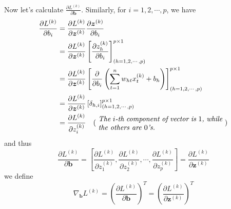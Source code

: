 \documentclass{article}
\newcommand{\Derivative}[2]{\ensuremath{\frac{\partial#1}{\partial#2}}}
\begin{document}
Now let's calculate $\Derivative{L^{(k)}}{\boldsymbol{b}}$. Similarly, for $i=1,2,\cdots,p$, we have
\begin{equation}
    \begin{split}
        \Derivative{L^{(k)}}{b_i}
        &=\Derivative{L^{(k)}}{\boldsymbol{z}^{(k)}}\Derivative{\boldsymbol{z}^{(k)}}{b_i}\\
        &=\Derivative{L^{(k)}}{\boldsymbol{z}^{(k)}}\left[
            \Derivative{z^{(k)}_h}{b_i}
        \right]^{p\times1}_{(h=1,2,\cdots,p)}\\
        &=\Derivative{L^{(k)}}{\boldsymbol{z}^{(k)}}\left[
            \Derivative{}{b_i}
            \left(
                \sum_{t=1}^n w_{ht}x^{(k)}_t+b_h
            \right)
        \right]^{p\times1}_{(h=1,2,\cdots,p)}\\
        &=\Derivative{L^{(k)}}{\boldsymbol{z}^{(k)}}\left[
            \delta_{h,i}
        \right]^{p\times1}_{(h=1,2,\cdots,p)}\\
        &=\Derivative{L^{(k)}}{z^{(k)}_i}\quad\text{(
            \parbox{0.5\linewidth}{\it The $i$-th component of vector is $1$, while the others are $0$'s.}
        )}
    \end{split}
\end{equation}
and thus
\begin{equation}
    \Derivative{L^{(k)}}{\boldsymbol{b}}=\left[
        \Derivative{L^{(k)}}{z^{(k)}_1},
        \Derivative{L^{(k)}}{z^{(k)}_2},
        \cdots,
        \Derivative{L^{(k)}}{z^{(k)}_p}
    \right]=\Derivative{L^{(k)}}{\boldsymbol{z}^{(k)}}
\end{equation}
we define
\begin{equation}
    \nabla_{\boldsymbol{b}}L^{(k)}=\left(
        \Derivative{L^{(k)}}{\boldsymbol{b}}
    \right)^T=\left(\Derivative{L^{(k)}}{\boldsymbol{z}^{(k)}}\right)^T
\end{equation}
\end{document}
